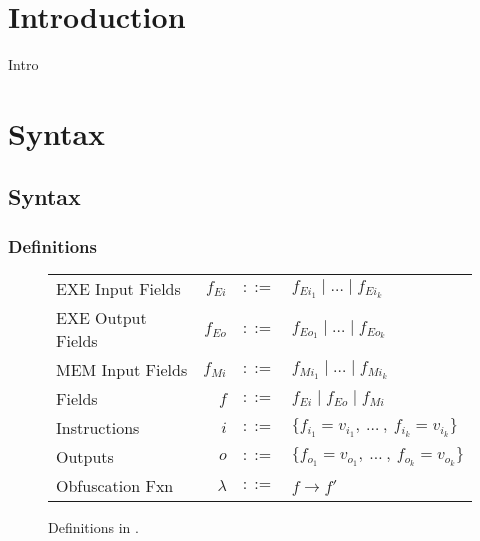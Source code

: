 \documentclass[sigconf,usenames,dvipsnames,svgnames,table]{acmart}
\begin{document}


\maketitle

\section{Introduction}
\sysname Intro
\cite{2011gem5sim}
\cite{2019stt}

  \section {Syntax}
    \subsection{Syntax}\label{sec:spec:synt}
      \subsubsection{Definitions}\label{sec:spec:synt:defn}
        \begin{figure}
          \centering
          \begin{tabular}{l r c l}
            EXE Input Fields  & $f_{Ei}$  & $::=$ & $f_{Ei_{1}} \mid \dots \mid f_{Ei_{k}}$\\
            EXE Output Fields & $f_{Eo}$  & $::=$ & $f_{Eo_{1}} \mid \dots \mid f_{Eo_{k}}$\\
            MEM Input Fields  & $f_{Mi}$  & $::=$ & $f_{Mi_{1}} \mid \dots \mid f_{Mi_{k}}$\\
            Fields            & $f$       & $::=$ & $f_{Ei} \mid f_{Eo} \mid f_{Mi} $ \\
            Instructions      & $i$       & $::=$ & $\{f_{i_{1}} = v_{i_{1}} ,\ \dots\ ,\ f_{i_{k}} = v_{i_{k}}\}$\\
            Outputs           & $o$       & $::=$ & $\{f_{o_{1}} = v_{o_{1}} ,\ \dots\ ,\ f_{o_{k}} = v_{o_{k}}\}$\\
            Obfuscation Fxn   & $\lambda$ & $::=$ & $f \rightarrow f'$
          \end{tabular}
          \caption{Definitions in \sysname.}
          \label{fig:spec:synt:defn}
        \end{figure}
\end{document}
